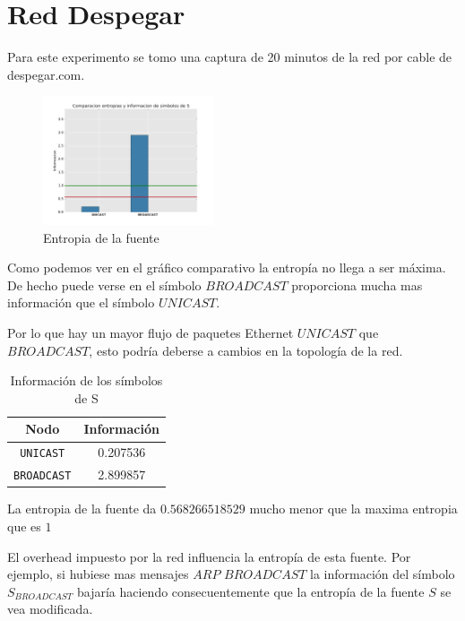 \section{Red Despegar}

Para este experimento se tomo una captura de 20 minutos de la red por cable de despegar.com.

\begin{figure}[H]
  \centering
    \includegraphics[width=0.45\textwidth]{entropia_red_despegar_s.png}
  \caption{Entropia de la fuente}
  \label{entropia-s}
\end{figure}

Como podemos ver en el gráfico comparativo la entropía no llega a ser máxima. De hecho puede verse en el símbolo $BROADCAST$ proporciona mucha mas información que el símbolo $UNICAST$. 

Por lo que hay un mayor flujo de paquetes Ethernet $UNICAST$ que $BROADCAST$, esto podría deberse a cambios en la topología de la red.


    \begin{table}[ht]\begin{center}
      \begin{tabular}{|c|c|}
      \hline
      \textbf{Nodo} & \textbf{Información} \\ \hline
      \texttt{UNICAST}& 0.207536 \\ \hline
      \texttt{BROADCAST}& 2.899857 \\ \hline
      \end{tabular}
      \caption{Información de los símbolos de S}
      \label{info-simbolos}
    \end{center}\end{table}

La entropia de la fuente da $0.568266518529$ mucho  menor que la maxima entropia que es $1$

El overhead impuesto por la red influencia la entropía de esta fuente.
Por ejemplo, si hubiese mas mensajes $ARP$ $BROADCAST$ la información del símbolo $S_{BROADCAST}$ bajaría haciendo consecuentemente que la entropía de la fuente $S$ se vea modificada.

